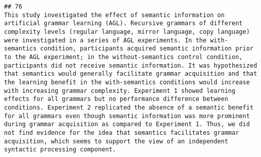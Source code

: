 \documentclass[
  english,
  man]{apa6}
\begin{document}
\begin{verbatim}
## 76                                                                                                                                                                                                                                                                                                                                                                                                                                                                                                                                                                                                                                                                                                                                                                                                                                                                                                                                                                                                                                                                                                                                                                                                                                                                                                                                                                                                                                                                                                                          This study investigated the effect of semantic information on artificial grammar learning (AGL). Recursive grammars of different complexity levels (regular language, mirror language, copy language) were investigated in a series of AGL experiments. In the with-semantics condition, participants acquired semantic information prior to the AGL experiment; in the without-semantics control condition, participants did not receive semantic information. It was hypothesized that semantics would generally facilitate grammar acquisition and that the learning benefit in the with-semantics conditions would increase with increasing grammar complexity. Experiment 1 showed learning effects for all grammars but no performance difference between conditions. Experiment 2 replicated the absence of a semantic benefit for all grammars even though semantic information was more prominent during grammar acquisition as compared to Experiment 1. Thus, we did not find evidence for the idea that semantics facilitates grammar acquisition, which seems to support the view of an independent syntactic processing component.

\end{verbatim}
\end{document}
